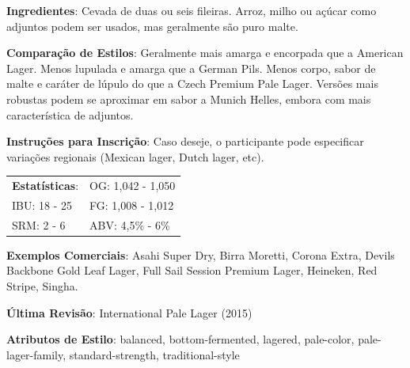 \textbf{Ingredientes}: Cevada de duas ou seis fileiras. Arroz, milho ou açúcar como adjuntos podem ser usados, mas geralmente são puro malte.

\textbf{Comparação de Estilos}: Geralmente mais amarga e encorpada que a American Lager. Menos lupulada e amarga que a German Pils. Menos corpo, sabor de malte e caráter de lúpulo do que a Czech Premium Pale Lager. Versões mais robustas podem se aproximar em sabor a Munich Helles, embora com mais característica de adjuntos.

\textbf{Instruções para Inscrição}: Caso deseje, o participante pode especificar variações regionais (Mexican lager, Dutch lager, etc).

\begin{tabular}{@{}p{35mm}p{35mm}@{}}
  \textbf{Estatísticas}: & OG: 1,042 - 1,050 \\
  IBU: 18 - 25  & FG: 1,008 - 1,012  \\
  SRM: 2 - 6   & ABV: 4,5\% - 6\%
\end{tabular}

\textbf{Exemplos Comerciais}: Asahi Super Dry, Birra Moretti, Corona Extra, Devils Backbone Gold Leaf Lager, Full Sail Session Premium Lager, Heineken, Red Stripe, Singha.

\textbf{Última Revisão}: International Pale Lager (2015)

\textbf{Atributos de Estilo}: balanced, bottom-fermented, lagered, pale-color, pale-lager-family, standard-strength, traditional-style